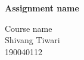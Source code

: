 \documentclass[12pt]{article}
\newcommand{\myname}{Shivang Tiwari}
\newcommand{\rollno}{190040112}
\newcommand{\asstitle}{Assignment name} %
\newcommand{\course}{Course name} %
\begin{document}
	\begin{titlepage}
		\begin{center}
			\vspace*{8cm}
			
			\huge{\textbf{\asstitle}}
			
			\vspace{0.5cm}
			\course\\
			\vspace{1.5cm}
			\myname\\
			\rollno
		\end{center}
	\end{titlepage}
\end{document}
